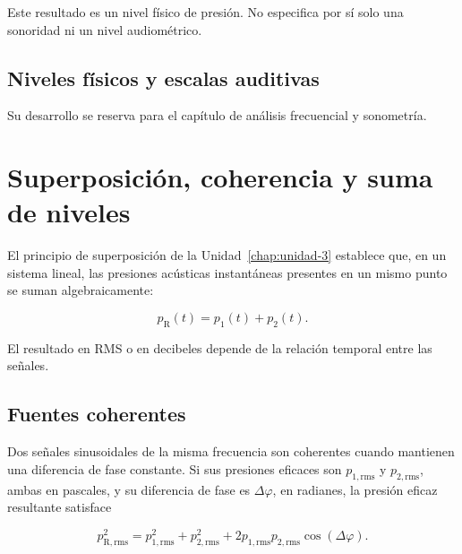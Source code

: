 Este resultado es un nivel físico de presión. No especifica por sí solo una
sonoridad ni un nivel audiométrico.

\subsection{Niveles físicos y escalas auditivas}
\label{sec:u4-niveles-auditivos}


 Su desarrollo se
reserva para el capítulo de análisis frecuencial y sonometría.

\section{Superposición, coherencia y suma de niveles}
\label{sec:u4-coherencia-suma}

El principio de superposición de la Unidad~\ref{chap:unidad-3} establece que,
en un sistema lineal, las presiones acústicas instantáneas presentes en un
mismo punto se suman algebraicamente:
\nopagebreak[4]

\begin{equation}
    p_\mathrm{R}(t)=p_1(t)+p_2(t).
    \label{eq:u4-suma-presiones}
\end{equation}

El resultado en RMS o en decibeles depende de la relación temporal entre las
señales.

\subsection{Fuentes coherentes}
\label{sec:u4-fuentes-coherentes}

Dos señales sinusoidales de la misma frecuencia son coherentes cuando mantienen
una diferencia de fase constante. Si sus presiones eficaces son
\(p_{1,\mathrm{rms}}\) y \(p_{2,\mathrm{rms}}\), ambas en pascales, y su
diferencia de fase es \(\Delta\varphi\), en radianes, la presión eficaz
resultante satisface

\begin{equation}
    p_{\mathrm{R,rms}}^2
      =p_{1,\mathrm{rms}}^2+p_{2,\mathrm{rms}}^2
       +2p_{1,\mathrm{rms}}p_{2,\mathrm{rms}}
        \cos(\Delta\varphi).
    \label{eq:u4-suma-coherente}
\end{equation}

